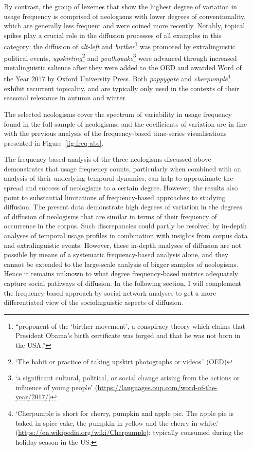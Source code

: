 \documentclass[
  a4paper,
  abstract=on,
  captions=tableabove,
  ]{scrartcl}
\newcommand{\ol}[1]{\emph{#1}}
\newcommand{\mn}[1]{`{#1}'}
\begin{document}
      By contrast, the group of lexemes that show the highest degree of variation in usage frequency is comprised of neologisms with lower degrees of conventionality, which are generally less frequent and were coined more recently. Notably, topical spikes play a crucial role in the diffusion processes of all examples in this category: the diffusion of \ol{alt-left} and \ol{birther}\footnote{\enquote{proponent of the \enquote{birther movement}, a conspiracy theory which claims that President Obama's birth certificate was forged and that he was not born in the USA.}} was promoted by extralinguistic political events, \ol{upskirting}\footnote{\mn{The habit or practice of taking upskirt photographs or videos.} (OED)} and \ol{youthquake}\footnote{\mn{a significant cultural, political, or social change arising from the actions or influence of young people} (\url{https://languages.oup.com/word-of-the-year/2017/})} were advanced through increased metalinguistic salience after they were added to the OED and awarded Word of the Year 2017 by Oxford University Press. Both \ol{poppygate} and \ol{cherpumple}\footnote{\mn{Cherpumple is short for cherry, pumpkin and apple pie. The apple pie is baked in spice cake, the pumpkin in yellow and the cherry in white.} (\url{https://en.wikipedia.org/wiki/Cherpumple}); typically consumed during the holiday season in the US.} exhibit recurrent topicality, and are typically only used in the contexts of their seasonal relevance in autumn and winter.

      The selected neologisms cover the spectrum of variability in usage frequency found in the full sample of neologisms, and the coefficients of variation are in line with the previous analysis of the frequency-based time-series visualisations presented in Figure~\ref{fig:freq-abs}.

        The frequency-based analysis of the three neologisms discussed above demonstrates that usage frequency counts, particularly when combined with an analysis of their underlying temporal dynamics, can help to approximate the spread and success of neologisms to a certain degree. However, the results also point to substantial limitations of frequency-based approaches to studying diffusion. The present data demonstrate high degrees of variation in the degrees of diffusion of neologisms that are similar in terms of their frequency of occurrence in the corpus. Such discrepancies could partly be resolved by in-depth analyses of temporal usage profiles in combination with insights from corpus data and extralinguistic events. However, these in-depth analyses of diffusion are not possible by means of a systematic frequency-based analysis alone, and they cannot be extended to the large-scale analysis of bigger samples of neologisms. Hence it remains unknown to what degree frequency-based metrics adequately capture social pathways of diffusion. In the following section, I will complement the frequency-based approach by social network analyses to get a more differentiated view of the sociolinguistic aspects of diffusion.
\end{document}

